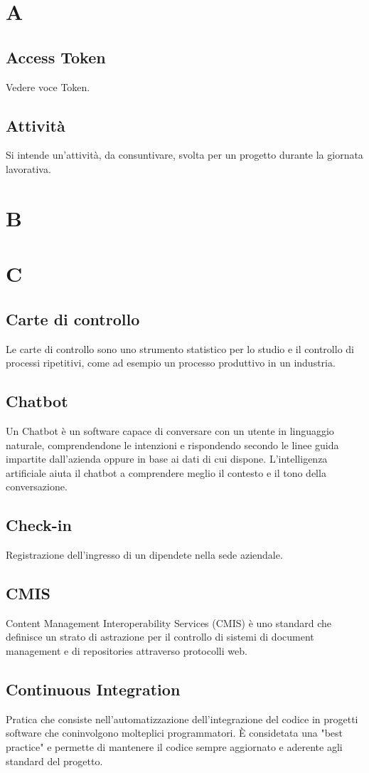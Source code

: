 \section{A}
\subsection{Access Token}
Vedere voce Token.
\subsection{Attività}
Si intende un'attività, da consuntivare, svolta per un progetto durante la giornata lavorativa.
\newpage
\section{B}
\section{C}
\subsection{Carte di controllo}
Le carte di controllo sono uno strumento statistico per lo studio e il controllo di processi ripetitivi, come ad esempio un processo produttivo in un industria.
\subsection{Chatbot}
Un Chatbot è un software capace di conversare con un utente in linguaggio naturale, comprendendone 
le intenzioni e rispondendo secondo le linee guida impartite dall'azienda oppure in 
base ai dati di cui dispone. L'intelligenza artificiale aiuta il chatbot a comprendere meglio il 
contesto e il tono della conversazione.
\subsection{Check-in}
Registrazione dell'ingresso di un dipendete nella sede aziendale.
\subsection{CMIS}
Content Management Interoperability Services (CMIS) è uno standard che definisce un strato di astrazione per il controllo di
sistemi di document management e di repositories attraverso protocolli web.
\subsection{Continuous Integration}
Pratica che consiste nell'automatizzazione dell'integrazione del codice in progetti software che coninvolgono
molteplici programmatori. È considetata una "best practice" e permette di mantenere il codice sempre aggiornato e 
aderente agli standard del progetto.
\newpage
